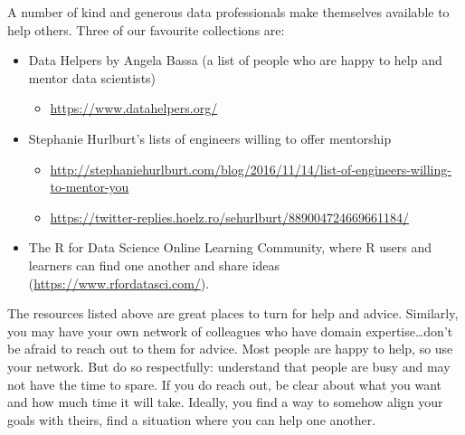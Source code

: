 \documentclass[
]{book}
\providecommand{\tightlist}{%
  \setlength{\itemsep}{0pt}\setlength{\parskip}{0pt}}
\begin{document}
A number of kind and generous data professionals make themselves available to help others. Three of our favourite collections are:

\begin{itemize}
\tightlist
\item
  Data Helpers by Angela Bassa (a list of people who are happy to help and mentor data scientists)

  \begin{itemize}
  \tightlist
  \item
    \url{https://www.datahelpers.org/}
  \end{itemize}
\item
  Stephanie Hurlburt's lists of engineers willing to offer mentorship

  \begin{itemize}
  \tightlist
  \item
    \url{http://stephaniehurlburt.com/blog/2016/11/14/list-of-engineers-willing-to-mentor-you}
  \item
    \url{https://twitter-replies.hoelz.ro/sehurlburt/889004724669661184/}
  \end{itemize}
\item
  The R for Data Science Online Learning Community, where R users and learners can find one another and share ideas (\url{https://www.rfordatasci.com/}).
\end{itemize}

The resources listed above are great places to turn for help and advice. Similarly, you may have your own network of colleagues who have domain expertise\ldots don't be afraid to reach out to them for advice. Most people are happy to help, so use your network. But do so respectfully: understand that people are busy and may not have the time to spare. If you do reach out, be clear about what you want and how much time it will take. Ideally, you find a way to somehow align your goals with theirs, find a situation where you can help one another.

  
\end{document}
